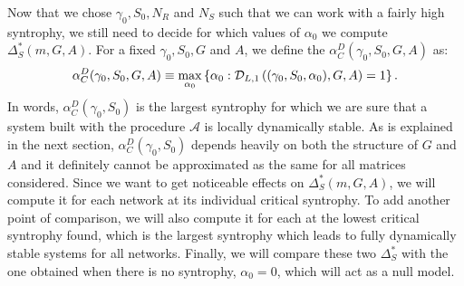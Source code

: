 \documentclass[12pt, titlepage]{report}
\begin{document}
Now that we chose $\gamma_0, S_0, N_R$ and $N_S$ such that we can work with a fairly high syntrophy, we still need to decide for which values of $\alpha_0$ we compute $\Delta_S^*(m, G, A)$. For a fixed $\gamma_0, S_0, G$ and $A$, we define the  $\alpha_C^D(\gamma_0, S_0, G, A)$ as:
\begin{equation}
 \alpha_C^D(\gamma_0, S_0, G, A)\equiv \max_{\alpha_0}\left\{\alpha_0 : \mathcal{D}_{L,1}\left((\gamma_0, S_0, \alpha_0), G, A\right)=1\right\}.
\end{equation}
In words, $\alpha_C^D(\gamma_0, S_0)$ is the largest syntrophy for which we are sure that a system built with the procedure $\mathcal{A}$ is locally dynamically stable. As is explained in the next section, $\alpha_C^D(\gamma_0, S_0)$ depends heavily on both the structure of $G$ and $A$ and it definitely cannot be approximated as the same for all matrices considered. Since we want to get noticeable effects on $\Delta_S^*(m, G, A)$, we will compute it for each network at its individual critical syntrophy. To add  another point of comparison, we will also compute it for each at the lowest critical syntrophy found, which is the largest syntrophy which leads to fully dynamically stable systems for all networks. Finally, we will compare these two $\Delta_S^*$ with the one obtained when there is no syntrophy, \ie $\alpha_0=0$, which will act as a null model.
\end{document}
